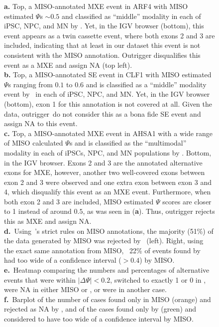 \begin{figure}
{\textbf{a.} Top, a MISO-annotated MXE event in ARF4 with MISO estimated $\Psi$s $\sim0.5$ and classified as ``middle'' modality in each of iPSC, NPC, and MN by \anchor. Yet, in the IGV browser (bottom), this event appears as a twin cassette event, where both exons 2 and 3 are included, indicating that at least in our dataset this event is not consistent with the MISO annotation. Outrigger disqualifies this event as a MXE and assign NA (top left).\\
\textbf{b.} Top, a MISO-annotated SE event in CLF1 with MISO estimated $\Psi$s ranging from $0.1$ to $0.6$ and is classified as a ``middle'' modality event by \anchor\, in each of iPSC, NPC, and MN.  Yet, in the IGV browser (bottom), exon 1 for this annotation is not covered at all. Given the data, outrigger\ do not consider this as a bona fide SE event and assign NA to this event.\\
\textbf{c.} Top, a MISO-annotated MXE event in AHSA1 with a wide range of MISO calculated $\Psi$s and is classified as the ``multimodal'' modality in each of iPSCs, NPC, and MN populations by \anchor. Bottom, in the IGV browser. Exons 2 and 3 are the annotated alternative exons for MXE, however, another two well-covered exons between exon 2 and 3 were observed and one extra exon between exon 3 and 4, which disqualify this event as an MXE event. Furthermore, when both exon 2 and 3 are included, MISO estimated $\Psi$ scores are closer to 1 instead of around $0.5$, as was seen in (\textbf{a}). Thus, outrigger rejects this as MXE and assign NA.\\
\textbf{d.}~Using \outrigger\,'s strict rules on MISO annotations, the majority (51\%) of the data generated by MISO was rejected by \outrigger\, (left). Right, using the exact same annotation from MISO, \outrigger\, 22\% of events found by \outrigger\, had too wide of a confidence interval ($>0.4$) by MISO.\\
\textbf{e.}~Heatmap comparing the numbers and percentages of alternative events that were within $|\Delta\Psi| < 0.2$, switched to exactly 1 or 0 in \outrigger, were NA in either MISO or \outrigger, or were in another case.\\
\textbf{f.}~Barplot of the number of cases found only in MISO (orange) and rejected as NA by \outrigger, and of the cases found only by \outrigger (green) and considered to have too wide of a confidence interval by MISO.\\
}
\end{figure}
